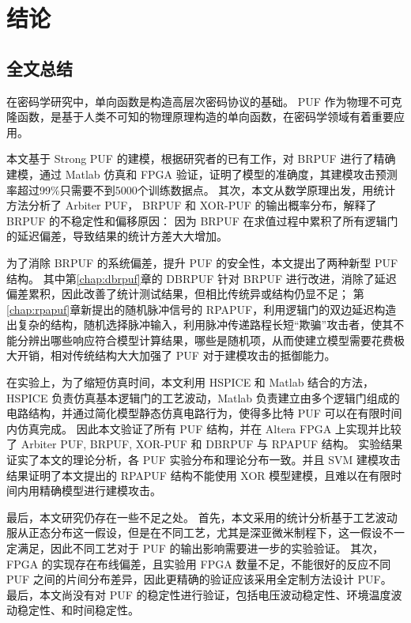 
\chapter{结论}\label{chap:conclusion}
\section{全文总结}
在密码学研究中，单向函数是构造高层次密码协议的基础。 PUF 作为物理不可克隆函数，是基于人类不可知的物理原理构造的单向函数，在密码学领域有着重要应用。

本文基于 Strong PUF 的建模，根据研究者的已有工作，对 BRPUF 进行了精确建模，通过 Matlab 仿真和 FPGA 验证，证明了模型的准确度，其建模攻击预测率超过99\%只需要不到5000个训练数据点。
其次，本文从数学原理出发，用统计方法分析了 Arbiter PUF， BRPUF 和 XOR-PUF 的输出概率分布，解释了 BRPUF 的不稳定性和偏移原因：
因为 BRPUF 在求值过程中累积了所有逻辑门的延迟偏差，导致结果的统计方差大大增加。

为了消除 BRPUF 的系统偏差，提升 PUF 的安全性，本文提出了两种新型 PUF 结构。
其中第\ref{chap:dbrpuf}章的 DBRPUF 针对 BRPUF 进行改进，消除了延迟偏差累积，因此改善了统计测试结果，但相比传统异或结构仍显不足；
第\ref{chap:rpapuf}章新提出的随机脉冲信号的 RPAPUF，利用逻辑门的双边延迟构造出复杂的结构，随机选择脉冲输入，利用脉冲传递路程长短``欺骗''攻击者，使其不能分辨出哪些响应符合模型计算结果，哪些是随机项，从而使建立模型需要花费极大开销，相对传统结构大大加强了 PUF 对于建模攻击的抵御能力。

在实验上，为了缩短仿真时间，本文利用 HSPICE 和 Matlab 结合的方法，HSPICE 负责仿真基本逻辑门的工艺波动，Matlab 负责建立由多个逻辑门组成的电路结构，并通过简化模型静态仿真电路行为，使得多比特 PUF 可以在有限时间内仿真完成。
因此本文验证了所有 PUF 结构，并在 Altera FPGA 上实现并比较了 Arbiter PUF, BRPUF, XOR-PUF 和 DBRPUF 与 RPAPUF 结构。
实验结果证实了本文的理论分析，各 PUF 实验分布和理论分布一致。并且 SVM 建模攻击结果证明了本文提出的 RPAPUF 结构不能使用 XOR 模型建模，且难以在有限时间内用精确模型进行建模攻击。

最后，本文研究仍存在一些不足之处。
首先，本文采用的统计分析基于工艺波动服从正态分布这一假设，但是在不同工艺，尤其是深亚微米制程下，这一假设不一定满足，因此不同工艺对于 PUF 的输出影响需要进一步的实验验证。
其次，FPGA 的实现存在布线偏差，且实验用 FPGA 数量不足，不能很好的反应不同 PUF 之间的片间分布差异，因此更精确的验证应该采用全定制方法设计 PUF。
最后，本文尚没有对 PUF 的稳定性进行验证，包括电压波动稳定性、环境温度波动稳定性、和时间稳定性。

